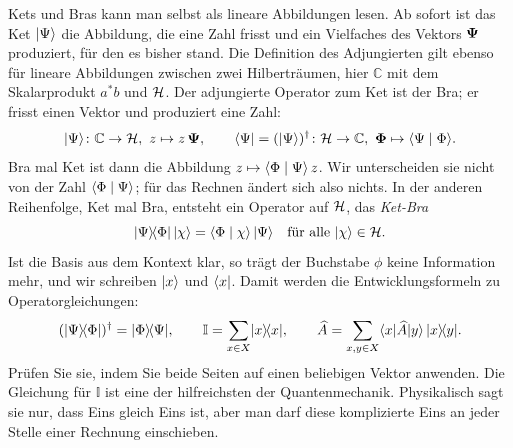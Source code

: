 Kets und Bras kann man selbst als lineare Abbildungen lesen. Ab sofort ist das Ket $\lvert \Psi \rangle$ die Abbildung, die eine Zahl frisst und ein Vielfaches des Vektors $\boldsymbol{\Psi}$ produziert, für den es bisher stand. Die Definition des Adjungierten gilt ebenso für lineare Abbildungen zwischen zwei Hilberträumen, hier $\mathbb{C}$ mit dem Skalarprodukt $a^*b$ und $\mathcal{H}$. Der adjungierte Operator zum Ket ist der Bra; er frisst einen Vektor und produziert eine Zahl:
\begin{equation}
	\lvert \Psi \rangle\colon \mathbb{C} \to \mathcal{H},\ z \mapsto z\,\boldsymbol{\Psi}, \qquad
	\langle \Psi \rvert = (\lvert \Psi \rangle)^{\dagger}\colon \mathcal{H} \to \mathbb{C},\ \boldsymbol{\Phi} \mapsto \langle \Psi \mid \Phi \rangle.
\end{equation}
Bra mal Ket ist dann die Abbildung $z \mapsto \langle \Phi \mid \Psi \rangle\,z$. Wir unterscheiden sie nicht von der Zahl $\langle \Phi \mid \Psi \rangle$; für das Rechnen ändert sich also nichts. In der anderen Reihenfolge, Ket mal Bra, entsteht ein Operator auf $\mathcal{H}$, das \emph{Ket-Bra}
\begin{equation}
	\lvert \Psi \rangle\!\langle \Phi \rvert\,\lvert \chi \rangle = \langle \Phi \mid \chi \rangle\,\lvert \Psi \rangle \quad \text{für alle } \lvert \chi \rangle\in\mathcal{H}.
\end{equation}
Ist die Basis aus dem Kontext klar, so trägt der Buchstabe $\phi$ keine Information mehr, und wir schreiben $\lvert x \rangle$ und $\langle x \rvert$. Damit werden die Entwicklungsformeln zu Operatorgleichungen:
\begin{equation}
	(\lvert \Psi \rangle\!\langle \Phi \rvert)^{\dagger} = \lvert \Phi \rangle\!\langle \Psi \rvert, \qquad
	\mathbb{I} = \sum_{x\in X}\lvert x \rangle\!\langle x \rvert, \qquad
	\widehat{A} = \sum_{x,y\in X}\langle x \rvert \widehat{A} \lvert y \rangle\,\lvert x \rangle\!\langle y \rvert.
\end{equation}
Prüfen Sie sie, indem Sie beide Seiten auf einen beliebigen Vektor anwenden. Die Gleichung für $\mathbb{I}$ ist eine der hilfreichsten der Quantenmechanik. Physikalisch sagt sie nur, dass Eins gleich Eins ist, aber man darf diese komplizierte Eins an jeder Stelle einer Rechnung einschieben.

